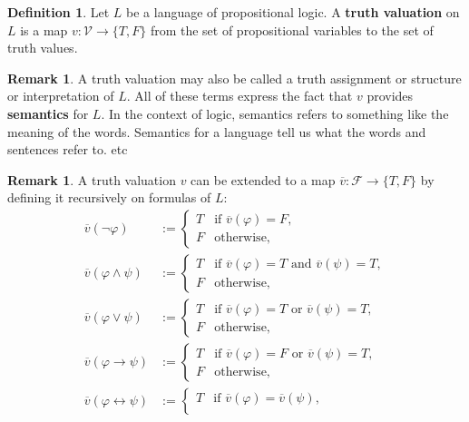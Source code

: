 \documentclass[12pt]{article}
\theoremstyle{definition}
\newtheorem{definition}[theorem]{Definition}
\newtheorem{remark}[theorem]{Remark}
\renewcommand{\phi}{\varphi}
\newcommand{\<}{\langle}
\renewcommand{\>}{\rangle}
\newcommand{\clo}{\overline}
\newcommand{\FF}{\mathcal{F}}
\newcommand{\VV}{\mathcal{V}}
\newcommand{\keyword}{\textbf}
\newcommand{\liff}{\leftrightarrow}
\begin{document}
\begin{definition}
    Let $L$ be a language of propositional logic.
    A \keyword{truth valuation} on $L$ is a map $v : \VV \to \{T, F\}$ from the set of propositional variables to the set of truth values.
\end{definition}

\begin{remark}
    A truth valuation may also be called a truth assignment or structure or interpretation of $L$.
    All of these terms express the fact that $v$ provides \keyword{semantics} for $L$.
    In the context of logic, semantics refers to something like the meaning of the words.
    Semantics for a language tell us what the words and sentences refer to.
    etc
\end{remark}

\begin{remark}
    A truth valuation $v$ can be extended to a map $\clo{v} : \FF \to \{T, F\}$ by defining it recursively on formulas of $L$:
    \begin{align*}
        \clo{v}(\lnot \phi) &:= \begin{cases}
            T & \text{if } \clo{v}(\phi) = F, \\
            F & \text{otherwise},
        \end{cases} \\
        \clo{v}(\phi \land \psi) &:= \begin{cases}
            T & \text{if } \clo{v}(\phi) = T \text{ and } \clo{v}(\psi) = T, \\
            F & \text{otherwise},
        \end{cases} \\
        \clo{v}(\phi \lor \psi) &:= \begin{cases}
            T & \text{if } \clo{v}(\phi) = T \text{ or } \clo{v}(\psi) = T, \\
            F & \text{otherwise},
        \end{cases} \\
        \clo{v}(\phi \to \psi) &:= \begin{cases}
            T & \text{if } \clo{v}(\phi) = F \text{ or } \clo{v}(\psi) = T, \\
            F & \text{otherwise},
        \end{cases} \\
        \clo{v}(\phi \liff \psi) &:= \begin{cases}
            T & \text{if } \clo{v}(\phi) = \clo{v}(\psi), \\

\end{cases}
\end{align*}
\end{remark}
\end{document}
